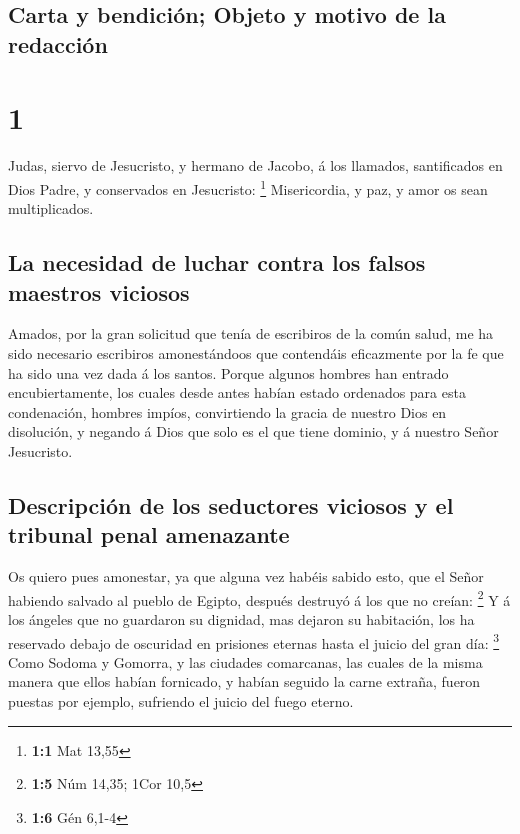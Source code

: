 \hypertarget{carta-y-bendiciuxf3n-objeto-y-motivo-de-la-redacciuxf3n}{%
\subsection{Carta y bendición; Objeto y motivo de la
redacción}\label{carta-y-bendiciuxf3n-objeto-y-motivo-de-la-redacciuxf3n}}

\hypertarget{section}{%
\section{1}\label{section}}

 Judas, siervo de Jesucristo, y hermano de Jacobo, á los
llamados, santificados en Dios Padre, y conservados en Jesucristo:
\footnote{\textbf{1:1} Mat 13,55}  Misericordia, y paz, y
amor os sean multiplicados.

\hypertarget{la-necesidad-de-luchar-contra-los-falsos-maestros-viciosos}{%
\subsection{La necesidad de luchar contra los falsos maestros
viciosos}\label{la-necesidad-de-luchar-contra-los-falsos-maestros-viciosos}}

 Amados, por la gran solicitud que tenía de escribiros de la
común salud, me ha sido necesario escribiros amonestándoos que
contendáis eficazmente por la fe que ha sido una vez dada á los santos.
 Porque algunos hombres han entrado encubiertamente, los
cuales desde antes habían estado ordenados para esta condenación,
hombres impíos, convirtiendo la gracia de nuestro Dios en disolución, y
negando á Dios que solo es el que tiene dominio, y á nuestro Señor
Jesucristo.

\hypertarget{descripciuxf3n-de-los-seductores-viciosos-y-el-tribunal-penal-amenazante}{%
\subsection{Descripción de los seductores viciosos y el tribunal penal
amenazante}\label{descripciuxf3n-de-los-seductores-viciosos-y-el-tribunal-penal-amenazante}}

 Os quiero pues amonestar, ya que alguna vez habéis sabido
esto, que el Señor habiendo salvado al pueblo de Egipto, después
destruyó á los que no creían: \footnote{\textbf{1:5} Núm 14,35; 1Cor
  10,5}  Y á los ángeles que no guardaron su dignidad, mas
dejaron su habitación, los ha reservado debajo de oscuridad en prisiones
eternas hasta el juicio del gran día: \footnote{\textbf{1:6} Gén 6,1-4}
 Como Sodoma y Gomorra, y las ciudades comarcanas, las
cuales de la misma manera que ellos habían fornicado, y habían seguido
la carne extraña, fueron puestas por ejemplo, sufriendo el juicio del
fuego eterno.

